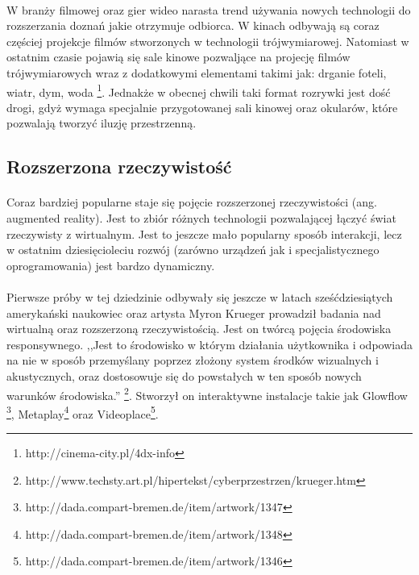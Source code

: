 {{\paragraph{}
W branży filmowej oraz gier wideo narasta trend używania nowych technologii do rozszerzania doznań jakie otrzymuje odbiorca.
W kinach odbywają są coraz częściej projekcje filmów stworzonych w technologii trójwymiarowej. Natomiast w ostatnim czasie pojawią się sale kinowe pozwaljące  na projecję filmów trójwymiarowych wraz z dodatkowymi elementami takimi jak: drganie foteli, wiatr, dym, woda \footnote{http://cinema-city.pl/4dx-info}. Jednakże w obecnej chwili taki format rozrywki jest dość drogi, gdyż wymaga specjalnie przygotowanej sali kinowej oraz okularów, które pozwalają tworzyć iluzję przestrzenną. 

\subsection{Rozszerzona rzeczywistość}
\paragraph{}
Coraz bardziej popularne staje się pojęcie rozszerzonej rzeczywistości (ang. augmented reality). Jest to zbiór różnych technologii pozwalającej łączyć świat rzeczywisty z wirtualnym. Jest to jeszcze mało popularny sposób interakcji, lecz w ostatnim dziesięcioleciu rozwój (zarówno urządzeń jak i specjalistycznego oprogramowania) jest bardzo dynamiczny.
\paragraph{}
Pierwsze próby w tej dziedzinie odbywały się jeszcze w latach sześćdziesiątych amerykański naukowiec oraz artysta Myron Krueger prowadził badania nad wirtualną oraz rozszerzoną rzeczywistością. Jest on twórcą pojęcia środowiska responsywnego. ,,Jest to środowisko w którym działania użytkownika i odpowiada na nie w sposób przemyślany poprzez złożony system środków wizualnych i akustycznych, oraz dostosowuje się do powstałych w ten sposób nowych warunków środowiska.'' \footnote{http://www.techsty.art.pl/hipertekst/cyberprzestrzen/krueger.htm}. Stworzył on interaktywne instalacje takie jak Glowflow \footnote{http://dada.compart-bremen.de/item/artwork/1347}, Metaplay\footnote{http://dada.compart-bremen.de/item/artwork/1348} oraz Videoplace\footnote{http://dada.compart-bremen.de/item/artwork/1346}.

}}
